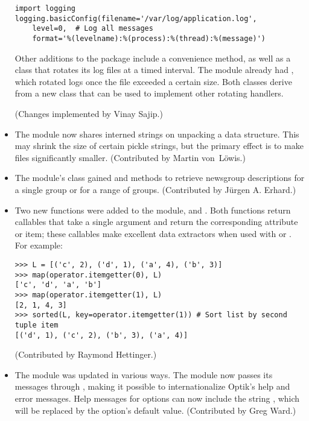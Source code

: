 \documentclass{howto}
\begin{document}
\begin{itemize}
\begin{verbatim}
import logging
logging.basicConfig(filename='/var/log/application.log',
    level=0,  # Log all messages
    format='%(levelname):%(process):%(thread):%(message)')	            
\end{verbatim}

Other additions to the  package include a
 convenience method, as well as a
 class that rotates its log files at a
timed interval.  The module already had ,
which rotated logs once the file exceeded a certain size.  Both
classes derive from a new  class that can
be used to implement other rotating handlers.

(Changes implemented by Vinay Sajip.)

\item The  module now shares interned strings on unpacking a 
data structure.  This may shrink the size of certain pickle strings,
but the primary effect is to make  files significantly smaller.
(Contributed by Martin von~L\"owis.)

\item The  module's  class gained
 and  methods to retrieve 
newsgroup descriptions for a single group or for a range of groups.
(Contributed by J\"urgen A. Erhard.)

\item Two new functions were added to the  module, 
 and .
Both functions return callables that take a single argument and return
the corresponding attribute or item; these callables make excellent
data extractors when used with  or
.  For example:

\begin{verbatim}
>>> L = [('c', 2), ('d', 1), ('a', 4), ('b', 3)]
>>> map(operator.itemgetter(0), L)
['c', 'd', 'a', 'b']
>>> map(operator.itemgetter(1), L)
[2, 1, 4, 3]
>>> sorted(L, key=operator.itemgetter(1)) # Sort list by second tuple item
[('d', 1), ('c', 2), ('b', 3), ('a', 4)]
\end{verbatim}

(Contributed by Raymond Hettinger.)       

\item The  module was updated in various ways.  The
module now passes its messages through ,
making it possible to internationalize Optik's help and error
messages.  Help messages for options can now include the string
, which will be replaced by the option's default
value.  (Contributed by Greg Ward.)


\end{itemize}
\end{document}
